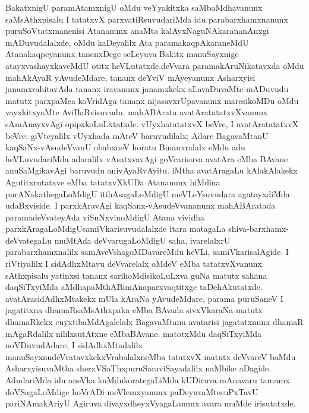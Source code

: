 BakatxnigU paramAtamxnigU oMdu veYyakitxka saMbaMdhavanunx saMsAthxpisalu I tatatxvX parxvatiRsuvudariMda idu parabarxhamxnanunx puruSoVtatxmanenisi Atananunx anaMta kalAyxNa\-guNAkarananAnxgi mADuvudalalxde, oMdu kaDeyalilx Ata paramakaqpAkaraneMdU Atana\break kaqpeyanunx tanenxDege seLeyuva Bakitx manuSayxnige atayxvashayxkaveMdU otitx heVLutatxde.\break deVvara paramakAruNikatavxda oMdu mahAkAyaR yAvudeMdare, tananx deYviV mAye\-yanunx Asharxyisi janamxrahitavAda tananx iravanunx janamxkekx aLavaDuvaMte mADuvudu matutx parxpaMca koVridAga tananx nijasavxrUpavanunx maresikoMDu oMdu vayxkitxyaMte AviBaRvisuvudu. mahABArata avatAratatatxvXvanunx sAmAnayxvAgi opipxkoLuLxtatxde. vUyxhatatatxvX beVre, I avatAratatatxvX beVre; giVteyalilx vUyxhada mAteV baruvudilalx; Adare BagavaMtanU kaqSaNx-vAsudeVvanU obabxneV horatu Binanxralalx eMdu adu heVLuvudariMda adaralilx vAsatxvavAgi goVcarisuva avatAra eMba BAvane anuSaMgika\-vAgi baruvudu anivAyaRvAyitu. iMtha avatAragaLu kAlakAlakekx Agutitxru\-tatxve eMba tatatxvXkUDa Atananunx hiMdina purANakathegaLoMdigU itihAsagaLoMdigU meVLeYsuvudara agatayxdiMda udaBxviside. I parxkAravAgi kaqSanx-vAsudeVvananunx mahA\break\-BAratada paramadeVvateyAda viSuNxvinoMdigU Atana vividha parxkAragaLoMdigU\break samiVkarisuvudalalxde itara matagaLa shiva-barxhamx-deVvategaLu muMtAda deVvaru\break\-gaLoMdigU saha, ivarelalxrU parabarxhamxnalilx samAveVshagoMDavareMdu heVLi, samiV\-karisalAgide. I riVtiyalilx I sidAdhxMtavu deVvarelalx oMdeV eMba tatatxvXvanunx sAthxpi\-salu yatinxsi tananx sarihoMdisikoLuLxva guNa matutx sahana daqSiTxyiMda aMdhapaMthABimAna\break parxvaqtitxge taDehAkutatxde. avatArasidAdhxMtakekx mUla kAraNa yAvudeMdare, parama puru\-SaneV I jagatitxna dhamaRsaMsAthxpaka eMba BAvada sivxVkaraNa matutx dhamaRkekx cuyxti\-baMdAgalelalx BagavaMtanu avatarisi jagatatxnunx dhamaR mAgaRdalilx nililxsutAtxne eMba\break BAvane. matotxMdu daqSiTxyiMda noVDuvudAdare, I sidAdhxMtadalilx manuSayxnu\break deVvatavxkekxVrabalalxneMba tatatxvX matutx deVvareV baMdu AsharxyisuvaMtha sherxVSaThxpuruSara\break viSayadalilx naMbike aDagide. AdudariMda idu aneVka kuMdukorategaLiMda kUDi\-ruva mAnavaru tamamx doVSagaLoMdige hoVrADi meVlemxyanunx paDeyuvaMte\break suPxTavU pariNAmakAriyU Agiruva divayxdheyxVyagaLanunx avara muMde irisutatxde.

\theendnotes


